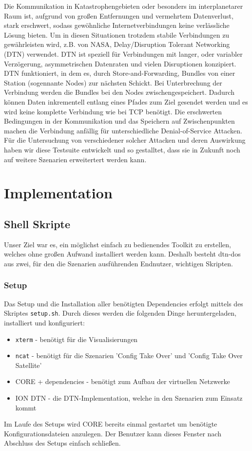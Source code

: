 \documentclass{article}
\begin{document}
Die Kommunikation in Katastrophengebieten oder besonders im interplanetarer Raum ist, aufgrund von großen Entfernungen und vermehrtem Datenverlust, stark erschwert, sodass gewöhnliche Internetverbindungen keine verlässliche Lösung bieten. Um in diesen Situationen trotzdem stabile Verbindungen zu gewährleisten wird, z.B. von NASA, Delay/Disruption Tolerant Networking (DTN) verwendet.
DTN ist speziell für Verbindungen mit langer, oder variabler Verzögerung, asymmetrischen Datenraten und vielen Disruptionen konzipiert. DTN funktioniert, in dem es, durch Store-and-Forwarding, Bundles von einer Station (sogennante Nodes) zur nächsten Schickt. Bei Unterbrechung der Verbindung werden die Bundles bei den Nodes zwischengespeichert. Dadurch können Daten inkrementell entlang eines Pfades zum Ziel gesendet werden und es wird keine komplette Verbindung wie bei TCP benötigt. 
Die erschwerten Bedingungen in der Kommunikation und das Speichern auf Zwischenpunkten machen die Verbindung anfällig für unterschiedliche Denial-of-Service Attacken. Für die Untersuchung von verschiedener solcher Attacken und deren Auswirkung haben wir diese Testsuite entwickelt und so gestalltet, dass sie in Zukunft noch auf weitere Szenarien erweitertert werden kann.  

\section{Implementation}
\subsection{Shell Skripte}
Unser Ziel war es, ein möglichst einfach zu bedienendes Toolkit zu erstellen, welches ohne großen Aufwand installiert werden kann. Deshalb besteht dtn-dos aus zwei, für den die Szenarien ausführenden Endnutzer, wichtigen Skripten.
\subsubsection{Setup}
Das Setup und die Installation aller benötigten Dependencies erfolgt mittels des Skriptes \texttt{setup.sh}. Durch dieses werden die folgenden Dinge heruntergeladen, installiert und konfiguriert:
\begin{itemize}
    \item \texttt{xterm} - benötigt für die Visualisierungen
    \item \texttt{ncat} - benötigt für die Szenarien 'Config Take Over' und 'Config Take Over Satellite'
    \item CORE + dependencies - benötigt zum Aufbau der virtuellen Netzwerke
    \item ION DTN - die DTN-Implementation, welche in den Szenarien zum Einsatz kommt
\end{itemize}
Im Laufe des Setups wird CORE bereits einmal gestartet um benötigte Konfigurationsdateien anzulegen. Der Benutzer kann dieses Fenster nach Abschluss des Setups einfach schließen. 
\end{document}
